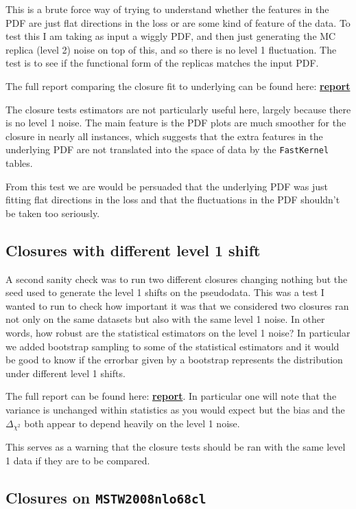 \documentclass[a4paper]{article}
\newcommand{\dcs}{ \Delta_{\chi^{2}} }
\begin{document}
This is a brute force way of trying to understand whether the features in the PDF
are just flat directions in the loss or are some kind of feature of the data. To
test this I am taking as input a wiggly PDF, and then just generating the MC
replica (level 2) noise on top of this, and so there is no level 1 fluctuation.
The test is to see if the functional form of the replicas matches the input PDF.

The full report comparing the closure fit to underlying can be found here:
\href{https://vp.nnpdf.science/tHdjyBVTQEOlfkNjUXPMFQ==}{\bf{report}}

The closure tests estimators are not particularly useful here, largely because
there is no level 1 noise. The main feature is the PDF plots are much smoother
for the closure in nearly all instances, which suggests that the extra features
in the underlying PDF are not translated into the space of data by the
\texttt{FastKernel} tables.

From this test we are would be persuaded that the underlying PDF was just fitting
flat directions in the loss and that the fluctuations in the PDF shouldn't be
taken too seriously.

\subsection{Closures with different level 1 shift}

A second sanity check was to run two different closures changing nothing but the
seed used to generate the level 1 shifts on the pseudodata. This was a test I
wanted to run to check how important it was that we considered two closures ran
not only on the same datasets but also with the same level 1 noise. In other
words, how robust are the statistical estimators on the level 1 noise? In particular
we added bootstrap sampling to some of the statistical estimators and it would
be good to know if the errorbar given by a bootstrap represents the distribution
under different level 1 shifts.

The full report can be found here:
\href{https://vp.nnpdf.science/mbcTUd6-TQmQFvaGd37bkg==}{\bf{report}}. In particular
one will note that the variance is unchanged within statistics as you would expect
but the bias and the $\dcs$ both appear to depend heavily on the level 1 noise.

This serves as a warning that the closure tests should be ran with the same level
1 data if they are to be compared.


\subsection{Closures on \texttt{MSTW2008nlo68cl}}
\end{document}
